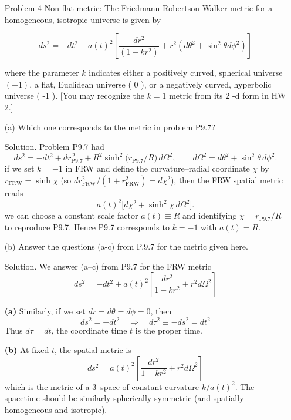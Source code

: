 \documentclass[12pt]{article}
\begin{document}
\begin{enumerate}
  \item[Problem 4] Non-flat metric: The Friedmann-Robertson-Walker metric for a homogeneous, isotropic universe is given by

  $$
  d s^2=-d t^2+a(t)^2\left[\frac{d r^2}{\left(1-k r^2\right)}+r^2\left(d \theta^2+\sin ^2 \theta d \phi^2\right)\right]
  $$
  
  where the parameter $k$ indicates either a positively curved, spherical universe $(+1)$, a flat, Euclidean universe ( 0 ), or a negatively curved, hyperbolic universe ( -1 ). [You may recognize the $k=1$ metric from its 2 -d form in HW 2.]
  \item[(a)] Which one corresponds to the metric in problem P9.7?
  
  \item[Solution.]
  Problem P9.7 had
  \[
  ds^2 = -dt^2 + dr_{\text{P9.7}}^{\,2} + R^2\sinh^2\!\big(r_{\text{P9.7}}/R\big)\,d\Omega^2,
  \qquad d\Omega^2=d\theta^2+\sin^2\theta\,d\phi^2.
  \]
  if we set $k=-1$ in FRW and define the curvature–radial coordinate $\chi$ by $r_{\text{FRW}}=\sinh\chi$ (so $dr_{\text{FRW}}^2/(1+r_{\text{FRW}}^2)=d\chi^2$), then the FRW spatial metric reads
  \[
  a(t)^2\big[d\chi^2+\sinh^2\chi\,d\Omega^2\big].
  \]
  we can choose a constant scale factor $a(t)\equiv R$ and identifying $\chi=r_{\text{P9.7}}/R$ to reproduce P9.7. 
  Hence P9.7 corresponds to $k=-1$ with $a(t)=R$.

  
  
  \item[(b)] Answer the questions (a-c) from P.9.7 for the metric given here.
  
  \item[Solution.]
  We answer (a–c) from P9.7 for the FRW metric
  \[
  ds^2=-dt^2+a(t)^2\!\left[\frac{dr^2}{1-kr^2}+r^2 d\Omega^2\right]
  \]

  \textbf{(a)}
  Similarly, if we set $dr=d\theta=d\phi=0$, then
  \[
  ds^2=-dt^2 \quad\Longrightarrow\quad d\tau^2\equiv -ds^2=dt^2
  \]
  Thus $\boxed{d\tau=dt}$, the coordinate time $t$ is the proper time.

  \textbf{(b)}
  At fixed $t$, the spatial metric is
  \[
  ds^2 = a(t)^2\!\left[\frac{dr^2}{1-kr^2}+r^2 d\Omega^2\right]
  \]
  which is the metric of a 3–space of constant curvature $k/a(t)^2$. The spacetime should be similarly spherically symmetric (and spatially homogeneous and isotropic). 


\end{enumerate}
\end{document}
